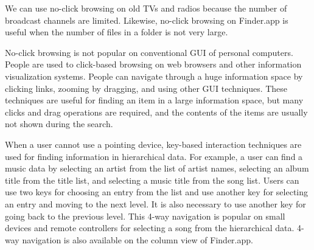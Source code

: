 \documentclass[conference]{IEEEtran}
\begin{document}
We can use no-click browsing on old TVs and radios because the number of
broadcast channels are limited.
Likewise, no-click browsing on Finder.app is useful
when the number of files in a folder is not very large.

No-click browsing is not popular on conventional GUI of personal computers.
People are used to click-based browsing on web browsers and other
information visualization systems.
People can navigate through a huge information space by
clicking links, zooming by dragging, and using other GUI techniques.
These techniques are useful for finding an item in a large information space,
but many clicks and drag operations are required,
and the contents of the items are usually not shown during the search.

% 



When a user cannot use a pointing device,
key-based interaction techniques are used for
finding information in hierarchical data.
%
For example, a user can find a music data by
selecting an artist from the list of artist names,
selecting an album title from the title list,
and selecting a music title from the song list.
%
Users can use two keys for choosing an entry from the list
and use another key for selecting an entry and moving to the next level.
It is also necessary to use another key for going back to the previous level.
This 4-way navigation is popular on small devices
and remote controllers for selecting a song from the hierarchical data.
4-way navigation is also available on the column view of Finder.app.
\end{document}
